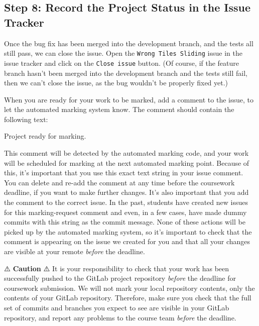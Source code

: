 \documentclass[
]{book}
\newenvironment{Shaded}{\begin{snugshade}}{\end{snugshade}}
\newcommand{\NormalTok}[1]{#1}
\begin{document}
\hypertarget{issuetracker}{%
\subsection{Step 8: Record the Project Status in the Issue Tracker}\label{issuetracker}}

Once the bug fix has been merged into the development branch, and the tests all still pass, we can close the issue. Open the \texttt{Wrong\ Tiles\ Sliding} issue in the issue tracker and click on the \texttt{Close\ issue} button. (Of course, if the feature branch hasn't been merged into the development branch and the tests still fail, then we can't close the issue, as the bug wouldn't be properly fixed yet.)

When you are ready for your work to be marked, add a comment to the issue, to let the automated marking system know. The comment should contain the following text:

\begin{Shaded}
\begin{Highlighting}[]
\NormalTok{Project ready for marking.}
\end{Highlighting}
\end{Shaded}

This comment will be detected by the automated marking code, and your work will be scheduled for marking at the next automated marking point. Because of this, it's important that you use this exact text string in your issue comment. You can delete and re-add the comment at any time before the coursework deadline, if you want to make further changes. It's also important that you add the comment to the correct issue. In the past, students have created new issues for this marking-request comment and even, in a few cases, have made dummy commits with this string as the commit message. None of these actions will be picked up by the automated marking system, so it's important to check that the comment is appearing on the issue we created for you and that all your changes are visible at your remote \emph{before} the deadline.

⚠️ \textbf{Caution} ⚠️
It is your responsibility to check that your work has been successfully pushed to the GitLab project repository \emph{before} the deadline for coursework submission. We will not mark your local repository contents, only the contents of your GitLab repository. Therefore, make sure you check that the full set of commits and branches you expect to see are visible in your GitLab repository, and report any problems to the course team \emph{before} the deadline.
\end{document}

